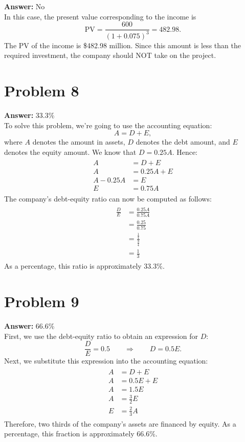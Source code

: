\documentclass[11pt]{article}
\begin{document}
\textbf{Answer:} No\\

In this case, the present value corresponding to the income is
\begin{equation}
\mathrm{PV}=\frac{600}{(1+0.075)^3}=482.98.
\end{equation}
The PV of the income is \$482.98 million. Since this amount is less than the
required investment, the company should NOT take on the project.
\section*{Problem 8}
\label{sec:org00907eb}

\textbf{Answer:} 33.3\%\\

To solve this problem, we're going to use the accounting equation:
\begin{equation}
A=D+E,
\end{equation}
where \(A\) denotes the amount in assets, \(D\) denotes the debt amount, and
\(E\) denotes the equity amount. We know that \(D=0.25 A\). Hence:
\begin{align}
  \begin{split}
    A&=D+E\\
    A&=0.25 A+E\\
    A-0.25 A&=E\\
    E&=0.75 A
  \end{split}
\end{align}
The company's debt-equity ratio can now be computed as follows:
\begin{align}
  \begin{split}
    \frac{D}{E}&=\frac{0.25 A}{0.75 A}\\
    &=\frac{0.25}{0.75}\\
    &=\frac{\frac{1}{4}}{\frac{3}{4}}\\
    &=\frac{1}{3}
  \end{split}
\end{align}
As a percentage, this ratio is approximately 33.3\%.
\section*{Problem 9}
\label{sec:org0be6fbf}

\textbf{Answer:} 66.6\%\\

First, we use the debt-equity ratio to obtain an expression for \(D\):
\begin{equation}
\frac{D}{E}=0.5\qquad\Rightarrow\qquad D=0.5 E.
\end{equation}
Next, we substitute this expression into the accounting equation:
\begin{align}
  \begin{split}
    A&=D+E\\
    A&=0.5 E+E\\
    A&=1.5 E\\
    A&=\frac{3}{2}E\\
    E&=\frac{2}{3}A
  \end{split}
\end{align}
Therefore, two thirds of the company's assets are financed by equity. As a
percentage, this fraction is approximately 66.6\%.
\end{document}
